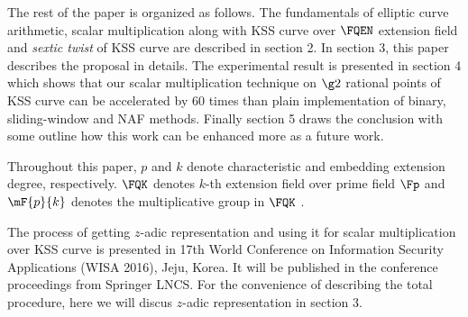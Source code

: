 The rest of the paper is organized as follows. 
The fundamentals of elliptic curve arithmetic, scalar multiplication along with KSS curve over $\FQEN$ extension field and \textit{sextic twist} of KSS curve are described in section 2.
In section 3, this paper describes the proposal in details. The experimental result is presented in section 4 which shows that our scalar multiplication technique on $\g2$ rational points of KSS curve can be accelerated by 60 times than plain implementation of binary, sliding-window and NAF methods. Finally section 5 draws the conclusion with some outline how this work can be enhanced more as a future work.

Throughout this paper, $p$ and $k$ denote characteristic and embedding extension degree, respectively. $\FQK$ denotes $k$-th extension field over prime field $\Fp$ and $\mF{p}{k}$ denotes the multiplicative group in $\FQK$ .

The process of getting $z$-adic representation and using it for scalar multiplication over KSS curve is presented in 17th World Conference on Information Security Applications (WISA 2016), Jeju, Korea. It will be published in the conference proceedings from Springer LNCS.  For the convenience of describing the total procedure, here we will discus $z$-adic representation in section 3.


